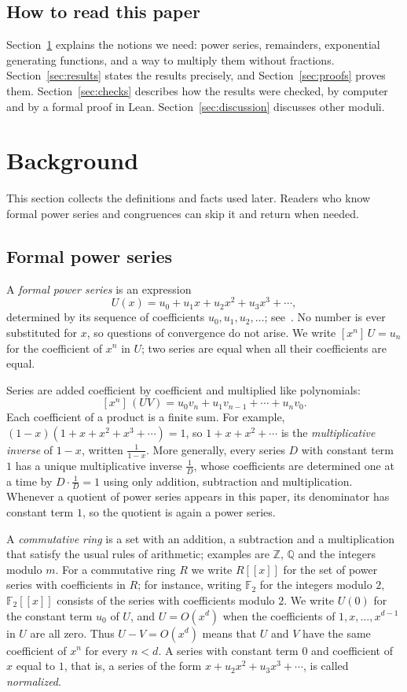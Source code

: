 \documentclass[11pt,a4paper]{article}
\theoremstyle{definition}
\theoremstyle{remark}
\newcommand{\Z}{\mathbb{Z}}
\newcommand{\Q}{\mathbb{Q}}
\newcommand{\F}{\mathbb{F}}
\newcommand{\ps}[1]{#1[[x]]}
\newcommand{\coeff}[2]{[x^{#1}]\,#2}
\begin{document}
\subsection{How to read this paper}
Section~\ref{sec:background} explains the notions we need: power series, remainders, exponential generating
functions, and a way to multiply them without fractions. Section~\ref{sec:results} states the results precisely, and
Section~\ref{sec:proofs} proves them. Section~\ref{sec:checks} describes how the results were checked, by computer
and by a formal proof in Lean. Section~\ref{sec:discussion} discusses other moduli.
\section{Background}\label{sec:background}
This section collects the definitions and facts used later. Readers who know formal power series and congruences can skip it and return when needed.
\subsection{Formal power series}
A \emph{formal power series} is an expression
\[
U(x)=u_0+u_1x+u_2x^2+u_3x^3+\cdots ,
\]
determined by its sequence of coefficients $u_0,u_1,u_2,\dots$; see~\cite{niven,stanley}. No number is ever
substituted for $x$, so questions of convergence do not arise. We write $\coeff{n}{U}=u_n$ for the coefficient of $x^n$ in $U$; two series are equal
when all their coefficients are equal.

Series are added coefficient by coefficient and multiplied like polynomials:
\[
\coeff{n}{(UV)}=u_0v_n+u_1v_{n-1}+\cdots+u_nv_0 .
\]
Each coefficient of a product is a finite sum. For example, $(1-x)(1+x+x^2+x^3+\cdots)=1$, so $1+x+x^2+\cdots$ is
the \emph{multiplicative inverse} of $1-x$, written $\frac{1}{1-x}$. More generally, every series $D$ with constant term
$1$ has a unique multiplicative inverse $\frac1D$, whose coefficients are determined one at a time by $D\cdot\frac1D=1$
using only addition, subtraction and multiplication. Whenever a quotient of power series appears in this paper, its
denominator has constant term $1$, so the quotient is again a power series.

A \emph{commutative ring} is a set with an addition, a subtraction and a multiplication that satisfy the usual rules
of arithmetic; examples are $\Z$, $\Q$ and the integers modulo $m$. For a commutative ring $R$ we write $\ps{R}$ for
the set of power series with coefficients in $R$; for instance, writing $\F_2$ for the integers modulo $2$, $\ps{\F_2}$
consists of the series with coefficients modulo $2$. We write
$U(0)$ for the constant term $u_0$ of $U$, and $U=O(x^d)$ when the coefficients of $1,x,\dots,x^{d-1}$ in $U$ are all
zero. Thus $U-V=O(x^d)$ means that $U$ and $V$ have the same coefficient of $x^n$ for every $n<d$. A series with
constant term $0$ and coefficient of $x$ equal to $1$, that is, a series of the form $x+u_2x^2+u_3x^3+\cdots$, is
called \emph{normalized}.
\end{document}
